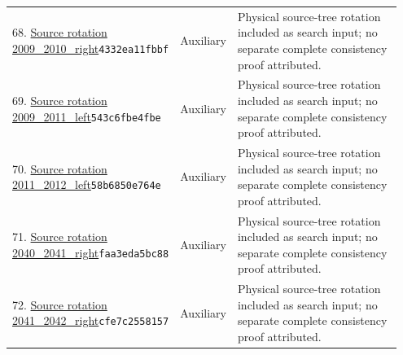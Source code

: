 \begin{longtable}{@{}p{0.27\linewidth}p{0.13\linewidth}p{0.55\linewidth}@{}}
68. \href{https://github.com/VladimirReshetnikov/ProveIt/blob/32d0d8b7d93a63ad4106c18cdb29b37927acdad2/Computability/BusyBeaver/Research/PA/docs/pa_consistency_research_2026-11-14_2/research/physical/inputs/source_programs/2009_2010_right/machine.native.tm}{Source rotation 2009\_\allowbreak{}2010\_\allowbreak{}right}\newline\texttt{4332ea11fbbf} & Auxiliary & Physical source-tree rotation included as search input; no separate complete consistency proof attributed.\\[5pt]
69. \href{https://github.com/VladimirReshetnikov/ProveIt/blob/32d0d8b7d93a63ad4106c18cdb29b37927acdad2/Computability/BusyBeaver/Research/PA/docs/pa_consistency_research_2026-11-14_2/research/physical/inputs/rotations/2009_2011_left.tm}{Source rotation 2009\_\allowbreak{}2011\_\allowbreak{}left}\newline\texttt{543c6fbe4fbe} & Auxiliary & Physical source-tree rotation included as search input; no separate complete consistency proof attributed.\\[5pt]
70. \href{https://github.com/VladimirReshetnikov/ProveIt/blob/32d0d8b7d93a63ad4106c18cdb29b37927acdad2/Computability/BusyBeaver/Research/PA/docs/pa_consistency_research_2026-11-14_2/research/physical/inputs/source_programs/2011_2012_left/machine.native.tm}{Source rotation 2011\_\allowbreak{}2012\_\allowbreak{}left}\newline\texttt{58b6850e764e} & Auxiliary & Physical source-tree rotation included as search input; no separate complete consistency proof attributed.\\[5pt]
71. \href{https://github.com/VladimirReshetnikov/ProveIt/blob/32d0d8b7d93a63ad4106c18cdb29b37927acdad2/Computability/BusyBeaver/Research/PA/docs/pa_consistency_research_2026-11-14_2/research/physical/inputs/rotations/2040_2041_right.tm}{Source rotation 2040\_\allowbreak{}2041\_\allowbreak{}right}\newline\texttt{faa3eda5bc88} & Auxiliary & Physical source-tree rotation included as search input; no separate complete consistency proof attributed.\\[5pt]
72. \href{https://github.com/VladimirReshetnikov/ProveIt/blob/32d0d8b7d93a63ad4106c18cdb29b37927acdad2/Computability/BusyBeaver/Research/PA/docs/pa_consistency_research_2026-11-14_2/research/physical/inputs/rotations/2041_2042_right.tm}{Source rotation 2041\_\allowbreak{}2042\_\allowbreak{}right}\newline\texttt{cfe7c2558157} & Auxiliary & Physical source-tree rotation included as search input; no separate complete consistency proof attributed.\\[5pt]

\end{longtable}
